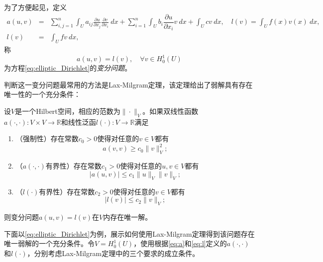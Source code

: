 \documentclass[a4paper,10pt]{ctexart}
\begin{document}
为了方便起见，定义
\begin{eqnarray}
    a(u,v) &=& \sum_{i,j=1}^n \int_U a_{ij}\frac{\partial u}{\partial x_j}\frac{\partial v}{\partial x_i}\ d x + \sum_{i=1}^n \int_Ub_i\dfrac{\partial u}{\partial x_i}v\ dx + \int_U cv\ dx,\quad l(v) = \int_U f(x)v(x)\ d x,\label{eq:a}\\
    l(v) &=& \int_U fv\ dx,\label{eq:l}
\end{eqnarray}
称
\begin{equation}
    a(u,v) = l(v),\quad \forall v\in H^1_0(U)
\end{equation}
为方程\eqref{eq:elliptic_Dirichlet}的\emph{变分问题}。

判断这一变分问题最常用的方法是Lax-Milgram定理，该定理给出了弱解具有存在唯一性的一个充分条件：
\begin{theorem}
    设$ V $是一个Hilbert空间，相应的范数为$ \|\cdot\|_V $。如果双线性函数$ a(\cdot,\cdot):V\times V\to \mathbb{R} $和线性泛函$ l(\cdot):V\to \mathbb{R} $满足
    \begin{enumerate}
        \item （强制性）存在常数$ c_0>0 $使得对任意的$ v\in V $都有
        \begin{equation}
            a(v,v) \geqslant c_0\|v\|_V^2;
        \end{equation}
        \item （$ a(\cdot,\cdot) $有界性）存在常数$ c_1>0 $使得对任意的$ u,v\in V $都有
        \begin{equation}
            |a(u,v)| \leqslant c_1\|u\|_V\|v\|_V;
        \end{equation}
        \item （$ l(\cdot) $有界性）存在常数$ c_2>0 $使得对任意的$ v\in V $都有
        \begin{equation}
            |l(v)| \leqslant c_2\|v\|_V;
        \end{equation}
    \end{enumerate}
    则变分问题$ a(u,v) = l(v) $在$ V $内存在唯一解。
\end{theorem}

下面以\eqref{eq:elliptic_Dirichlet}为例，展示如何使用Lax-Milgram定理得到该问题存在唯一弱解的一个充分条件。令$ V = H^1_0(U) $，使用根据\eqref{eq:a}和\eqref{eq:l}定义的$ a(\cdot,\cdot) $和$ l(\cdot) $，分别考虑Lax-Milgram定理中的三个要求的成立条件。
\end{document}
